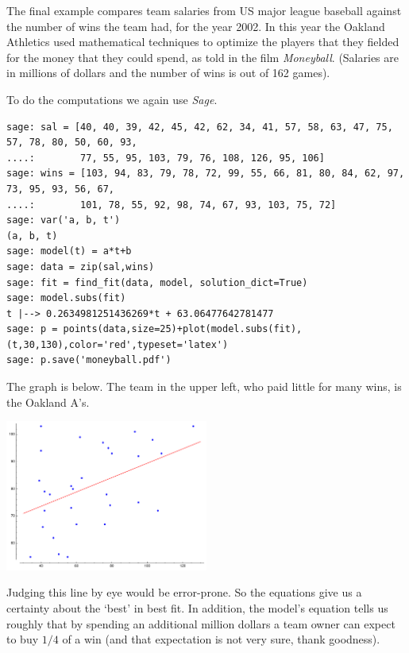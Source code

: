 The final example
compares team salaries from US major league baseball 
against the number of wins the team had, for the year 2002.
In this year the Oakland Athletics 
used mathematical techniques to optimize the players that they fielded
for the money that they could spend, as told in  
the film \textit{Moneyball}.
(Salaries are in millions of dollars and the number of wins
is out of 162 games). 

To do the computations we again use \textit{Sage}. 
\begin{lstlisting}
sage: sal = [40, 40, 39, 42, 45, 42, 62, 34, 41, 57, 58, 63, 47, 75, 57, 78, 80, 50, 60, 93,
....:        77, 55, 95, 103, 79, 76, 108, 126, 95, 106]
sage: wins = [103, 94, 83, 79, 78, 72, 99, 55, 66, 81, 80, 84, 62, 97, 73, 95, 93, 56, 67,
....:        101, 78, 55, 92, 98, 74, 67, 93, 103, 75, 72]
sage: var('a, b, t')
(a, b, t)
sage: model(t) = a*t+b
sage: data = zip(sal,wins)
sage: fit = find_fit(data, model, solution_dict=True)
sage: model.subs(fit)
t |--> 0.2634981251436269*t + 63.06477642781477
sage: p = points(data,size=25)+plot(model.subs(fit),(t,30,130),color='red',typeset='latex')
sage: p.save('moneyball.pdf')
\end{lstlisting}

The graph is below.
The team in the upper left, who paid little for many wins, is
the Oakland A's.

\begin{center}  \small
  \includegraphics[width=0.5\textwidth]{map/pix/moneyball.pdf}
\end{center}

Judging this line by eye would be error-prone.
So the equations give us a certainty about the `best' in best fit.
In addition, the model's equation tells us roughly that 
by spending an additional million dollars
a team owner can expect to buy $1/4$ of a win
(and that expectation is not very sure, thank goodness).



